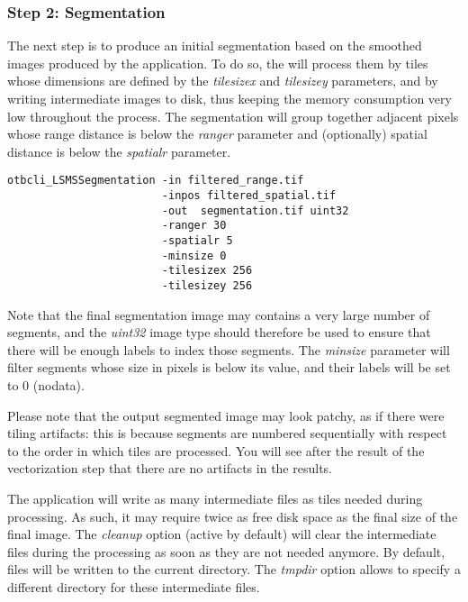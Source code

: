 \subsubsection{Step 2: Segmentation}

The next step is to produce an initial segmentation based on the
smoothed images produced by the 
application. To do so, the  will process
them by tiles whose dimensions are defined by the
\emph{tilesizex} and \emph{tilesizey} parameters, and by
writing intermediate images to disk, thus keeping the memory
consumption very low throughout the process. The segmentation will
group together adjacent pixels whose range distance is below the
\emph{ranger} parameter and (optionally) spatial distance is
below the \emph{spatialr} parameter.

\begin{verbatim}
otbcli_LSMSSegmentation -in filtered_range.tif
                        -inpos filtered_spatial.tif
                        -out  segmentation.tif uint32 
                        -ranger 30 
                        -spatialr 5 
                        -minsize 0 
                        -tilesizex 256 
                        -tilesizey 256
\end{verbatim}

Note that the final segmentation image may contains a very large
number of segments, and the \emph{uint32} image type should
therefore be used to ensure that there will be enough labels to index
those segments. The \emph{minsize} parameter will filter segments
whose size in pixels is below its value, and their labels will be set
to 0 (nodata). 

Please note that the output segmented image may look patchy, as if
there were tiling artifacts: this is because segments are numbered
sequentially with respect to the order in which tiles are
processed. You will see after the result of the vectorization step
that there are no artifacts in the results.

The  application will write as many
intermediate files as tiles needed during processing. As such, it may
require twice as free disk space as the final size of the final
image. The \emph{cleanup} option (active by default) will clear the
intermediate files during the processing as soon as they are not
needed anymore. By default, files will be written to the current
directory. The \emph{tmpdir} option allows to specify a different
directory for these intermediate files.

